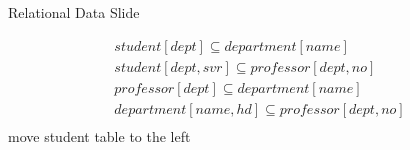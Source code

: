 
\newcommand{\studentDeptInclusionDependency}
{student[dept] \subseteq department[name]}
\newcommand{\studentSupervisorInclusionDependency}
{student[dept,svr] \subseteq professor[dept,no]}
\newcommand{\professorDeptInclusionDependency}
{professor[dept] \subseteq department[name]}
\newcommand{\headOfDeptInclusionDependency}
{department[name,hd]  \subseteq professor[dept,no]}

\begin{frame}{Relational Data Slide}

\begin{align*}
\studentDeptInclusionDependency  \\
\studentSupervisorInclusionDependency\\
\professorDeptInclusionDependency\\
\headOfDeptInclusionDependency  \\
\end{align*}
{\small{move student table to the left}}
\end{frame}
